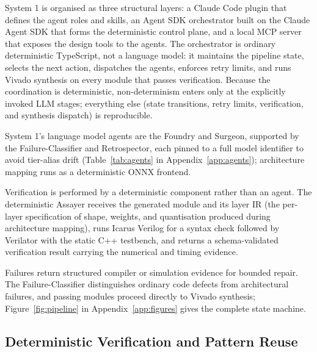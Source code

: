 \documentclass[acmtog,authorversion]{acmart}
\begin{document}
System 1 is organised as three structural layers: a Claude Code plugin that defines the agent roles and skills, an Agent SDK orchestrator built on the Claude Agent SDK that forms the deterministic control plane, and a local MCP server~\cite{anthropic2025mcp} that exposes the design tools to the agents. The orchestrator is ordinary deterministic TypeScript, not a language model: it maintains the pipeline state, selects the next action, dispatches the agents, enforces retry limits, and runs Vivado synthesis on every module that passes verification. Because the coordination is deterministic, non-determinism enters only at the explicitly invoked LLM stages; everything else (state transitions, retry limits, verification, and synthesis dispatch) is reproducible.

System 1's language model agents are the Foundry and Surgeon, supported by the Failure-Classifier and Retrospector, each pinned to a full model identifier to avoid tier-alias drift (Table~\ref{tab:agents} in Appendix~\ref{app:agents}); architecture mapping runs as a deterministic ONNX frontend.

Verification is performed by a deterministic component rather than an agent. The deterministic Assayer receives the generated module and its layer IR (the per-layer specification of shape, weights, and quantisation produced during architecture mapping), runs Icarus Verilog for a syntax check followed by Verilator with the static C++ testbench, and returns a schema-validated verification result carrying the numerical and timing evidence.

Failures return structured compiler or simulation evidence for bounded repair. The Failure-Classifier distinguishes ordinary code defects from architectural failures, and passing modules proceed directly to Vivado synthesis; Figure~\ref{fig:pipeline} in Appendix~\ref{app:figures} gives the complete state machine.

\subsection{Deterministic Verification and Pattern Reuse}
\label{sec:verification}
\end{document}
